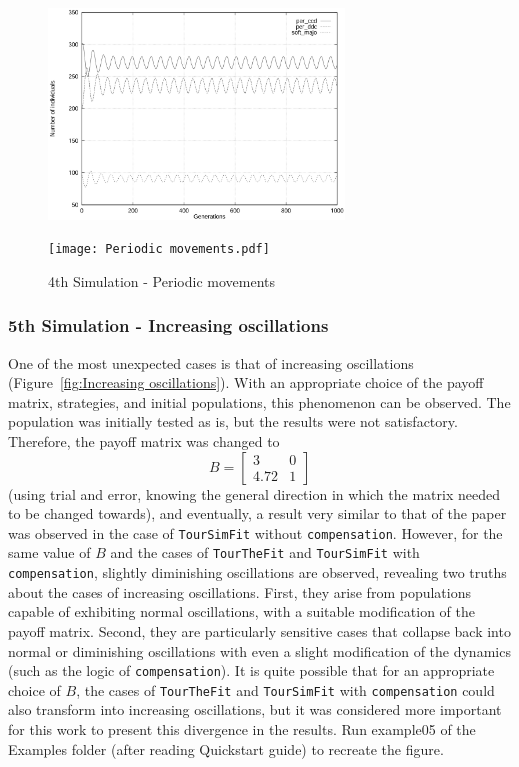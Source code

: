 	\begin{figure}[h]
	    \centering
		\includegraphics[width=0.7\textwidth]{RefPaperFigures/fig4.jpeg}\par\vspace{0.5em}
	    \texttt{[image: Periodic movements.pdf]}
	    \caption{4th Simulation - Periodic movements}
	    \label{fig:Periodic movements}
	\end{figure}
\subsubsection{5th Simulation - Increasing oscillations}
One of the most unexpected cases is that of increasing oscillations (Figure~\ref{fig:Increasing oscillations}). With an appropriate choice of the payoff matrix, strategies, and initial populations, this phenomenon can be observed. The population was initially tested as is, but the results were not satisfactory. Therefore, the payoff matrix was changed to 
\[
B = \begin{bmatrix} 3 & 0 \\ 4.72 & 1 \end{bmatrix}
\]
(using trial and error, knowing the general direction in which the matrix needed to be changed towards), and eventually, a result very similar to that of the paper was observed in the case of \texttt{TourSimFit} without \texttt{compensation}. However, for the same value of \( B \) and the cases of \texttt{TourTheFit} and \texttt{TourSimFit} with \texttt{compensation}, slightly diminishing oscillations are observed, revealing two truths about the cases of increasing oscillations. First, they arise from populations capable of exhibiting normal oscillations, with a suitable modification of the payoff matrix. Second, they are particularly sensitive cases that collapse back into normal or diminishing oscillations with even a slight modification of the dynamics (such as the logic of \texttt{compensation}). It is quite possible that for an appropriate choice of \( B \), the cases of \texttt{TourTheFit} and \texttt{TourSimFit} with \texttt{compensation} could also transform into increasing oscillations, but it was considered more important for this work to present this divergence in the results. Run example05 of the Examples folder (after reading Quickstart guide) to recreate the figure.

